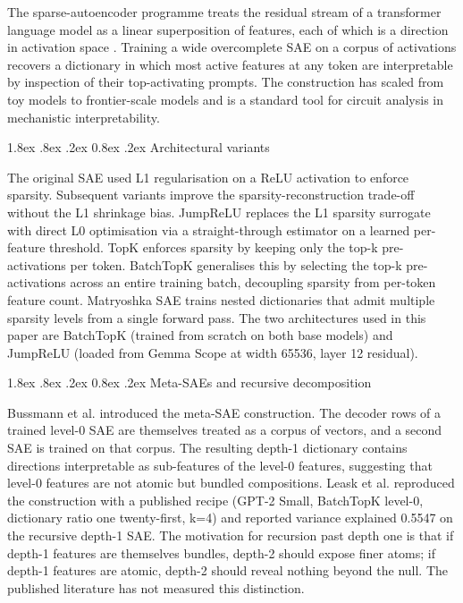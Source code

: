 \documentclass[conference]{IEEEtran}
\makeatletter
\renewcommand\subsection{\@startsection{subsection}{2}{\z@}%
   {1.8ex \@plus .8ex \@minus .2ex}%
   {0.8ex \@plus .2ex}%
   {\normalfont\large\bfseries}}
\makeatother
\begin{document}
The sparse-autoencoder programme treats the residual stream of a
transformer language model as a linear superposition of features, each
of which is a direction in activation space
\autocite{bricken2023monosemanticity,cunningham2024sparse}. Training a
wide overcomplete SAE on a corpus of activations recovers a dictionary
in which most active features at any token are interpretable by
inspection of their top-activating prompts. The construction has scaled
from toy models to frontier-scale models
\autocite{gao2024scaling,lieberum2024gemma} and is a standard tool for
circuit analysis in mechanistic interpretability.

\hypertarget{b.-architectural-variants}{%
\subsection{Architectural variants}\label{b.-architectural-variants}}

The original SAE used L1 regularisation on a ReLU activation to enforce
sparsity. Subsequent variants improve the sparsity-reconstruction
trade-off without the L1 shrinkage bias. JumpReLU
\autocite{rajamanoharan2024jumping} replaces the L1 sparsity surrogate
with direct L0 optimisation via a straight-through estimator on a
learned per-feature threshold. TopK \autocite{gao2024scaling} enforces
sparsity by keeping only the top-k pre-activations per token. BatchTopK
\autocite{bussmann2024batchtopk} generalises this by selecting the top-k
pre-activations across an entire training batch, decoupling sparsity
from per-token feature count. Matryoshka SAE
\autocite{bussmann2025learning} trains nested dictionaries that admit
multiple sparsity levels from a single forward pass. The two
architectures used in this paper are BatchTopK (trained from scratch on
both base models) and JumpReLU (loaded from Gemma Scope at width 65536,
layer 12 residual).

\hypertarget{c.-meta-saes-and-recursive-decomposition}{%
\subsection{Meta-SAEs and recursive
decomposition}\label{c.-meta-saes-and-recursive-decomposition}}

Bussmann et al. \autocite{bussmann2024showingsaeslearn} introduced the
meta-SAE construction. The decoder rows of a trained level-0 SAE are
themselves treated as a corpus of vectors, and a second SAE is trained
on that corpus. The resulting depth-1 dictionary contains directions
interpretable as sub-features of the level-0 features, suggesting that
level-0 features are not atomic but bundled compositions. Leask et al.
\autocite{leask2025sparse} reproduced the construction with a published
recipe (GPT-2 Small, BatchTopK level-0, dictionary ratio one
twenty-first, k=4) and reported variance explained 0.5547 on the
recursive depth-1 SAE. The motivation for recursion past depth one is
that if depth-1 features are themselves bundles, depth-2 should expose
finer atoms; if depth-1 features are atomic, depth-2 should reveal
nothing beyond the null. The published literature has not measured this
distinction.
\end{document}
